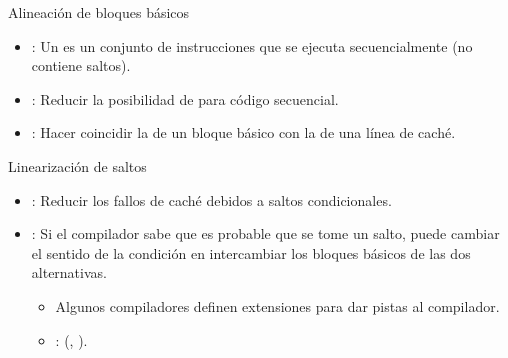 \begin{frame}[t]{Alineación de bloques básicos}
\begin{itemize}
  \item {}: 
        Un  es un conjunto de instrucciones 
        que se ejecuta secuencialmente (no contiene saltos).

  \item {}: Reducir la posibilidad de 
         para código secuencial.

  \item {}: 
        Hacer coincidir la  de un bloque básico 
        con la  de una línea de caché.
\end{itemize}
\end{frame}

\begin{frame}[t]{Linearización de saltos}
\begin{itemize}
  \item {}: Reducir los fallos de caché debidos a saltos condicionales.

  \item {}: Si el compilador sabe que es probable que se tome un salto, 
        puede cambiar el sentido de la condición en intercambiar los bloques 
        básicos de las dos alternativas.
    \begin{itemize}
      \item Algunos compiladores definen extensiones para dar pistas al compilador.
      \item {}:  (\cppkey{[[likely]]}, \cppkey{[[unlikely]]}).
    \end{itemize}

\end{itemize}
\end{frame}

